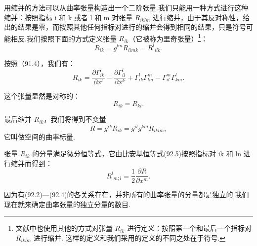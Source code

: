 用缩并的方法可以从曲率张量构造出一个二阶张量.我们只能用一种方式进行这种缩并：按照指标 i 和 k 或者 l 和 m 对张量 $R_{iklm}$ 进行缩并，由于其反对称性，给出的结果是零，而按照其他任何指标对进行的缩并会得到相同的结果，只是符号可能相反.我们按照下面的方式定义张量 $R_{ik}$（它被称为里奇张量）\footnote{文献中也使用其他的方式对张量 $R_{ik}$ 进行定义：按照第一个和最后一个指标对 $R_{iklm}$ 进行缩并. 这样的定义和我们采用的定义的不同之处在于符号.}：
\begin{equation}
  R_{ik}=g^{lm}R_{limk}=R^l{}_{ilk}.
\end{equation}

按照（91.4），我们有：
\begin{equation}
  R_{ik}=\frac{\partial\Gamma^l_{ik}}{\partial x^l}
  -\frac{\partial\Gamma^l_{il}}{\partial x^k}
  +\Gamma^l_{ik}\Gamma^m_{lm}-\Gamma^m_{il}\Gamma^l_{km}.
\end{equation}

这个张量显然是对称的：
\begin{equation}
  R_{ik}=R_{ki}.
\end{equation}

最后缩并 $R_{ik}$，我们将得到不变量
\begin{equation}
  R=g^{ik}R_{ik}=g^{il}g^{km}R_{iklm},
\end{equation}
它叫做空间的曲率标量.

张量 $R_{ik}$ 的分量满足微分恒等式，它由比安基恒等式(92.5)按照指标对 ik 和 ln 进行缩并而得到：
\begin{equation}
  R^l{}_{m;l}=\frac{1}{2}\frac{\partial R}{\partial x^m}.
\end{equation}

因为有(92.2)—(92.4)的各关系存在，并非所有的曲率张量的分量都是独立的.我们现在就来确定曲率张量的独立分量的数目.

